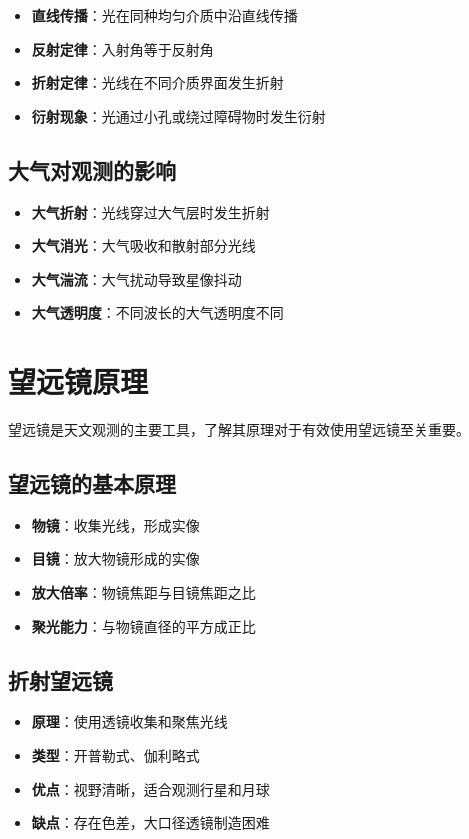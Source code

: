 \documentclass[12pt,UTF8]{ctexbook}
\begin{document}
\begin{itemize}
  \item \textbf{直线传播}：光在同种均匀介质中沿直线传播
  \item \textbf{反射定律}：入射角等于反射角
  \item \textbf{折射定律}：光线在不同介质界面发生折射
  \item \textbf{衍射现象}：光通过小孔或绕过障碍物时发生衍射
\end{itemize}

\subsection{大气对观测的影响}

\begin{itemize}
  \item \textbf{大气折射}：光线穿过大气层时发生折射
  \item \textbf{大气消光}：大气吸收和散射部分光线
  \item \textbf{大气湍流}：大气扰动导致星像抖动
  \item \textbf{大气透明度}：不同波长的大气透明度不同
\end{itemize}

\section{望远镜原理}

望远镜是天文观测的主要工具，了解其原理对于有效使用望远镜至关重要。

\subsection{望远镜的基本原理}

\begin{itemize}
  \item \textbf{物镜}：收集光线，形成实像
  \item \textbf{目镜}：放大物镜形成的实像
  \item \textbf{放大倍率}：物镜焦距与目镜焦距之比
  \item \textbf{聚光能力}：与物镜直径的平方成正比
\end{itemize}

\subsection{折射望远镜}

\begin{itemize}
  \item \textbf{原理}：使用透镜收集和聚焦光线
  \item \textbf{类型}：开普勒式、伽利略式
  \item \textbf{优点}：视野清晰，适合观测行星和月球
  \item \textbf{缺点}：存在色差，大口径透镜制造困难
\end{itemize}
\end{document}
